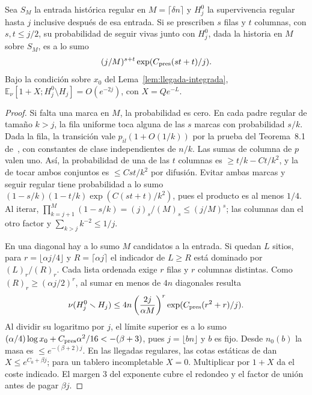 \begin{lema}\label{lem:prescripcion-larga}
Sea \(S_M\) la entrada histórica regular en \(M=\lceil\delta n\rceil\) y \(H^0_j\)
la supervivencia regular hasta \(j\) inclusive después de esa entrada. Si se prescriben
\(s\) filas y \(t\) columnas, con \(s,t\le j/2\), su probabilidad de seguir vivas junto
con \(H_j^0\), dada la historia en \(M\) sobre \(S_M\), es a lo sumo
\[
 (j/M)^{s+t}\exp(C_{\rm pres}(st+t)/j).
\]
Bajo la condición sobre \(x_0\) del Lema~\ref{lem:llegada-integrada},
\(\mathbb E_\nu[1+X;H^0_j\setminus H_j]=O(e^{-2j})\), con \(X=Qe^{-L}\).
\end{lema}
\begin{proof}
Si falta una marca en \(M\), la probabilidad es cero. En cada padre regular de tamaño
\(k>j\), la fila uniforme toca alguna de las \(s\) marcas con probabilidad \(s/k\).
Dada la fila, la transición vale \(p_{il}(1+O(1/k))\) por la prueba del
Teorema~8.1 de~\cite{pc}, con constantes de clase independientes de \(n/k\).
Las sumas de columna de \(p\) valen uno. Así, la probabilidad de una de las \(t\) columnas
es \(\ge t/k-Ct/k^2\), y la de tocar ambos conjuntos es \(\le Cst/k^2\) por difusión.
Evitar ambas marcas y seguir regular tiene probabilidad a lo sumo
\((1-s/k)(1-t/k)\exp(C(st+t)/k^2)\), pues el producto es al menos \(1/4\).
Al iterar, \(\prod_{k=j+1}^M(1-s/k)=(j)_s/(M)_s\le(j/M)^s\);
las columnas dan el otro factor y \(\sum_{k>j}k^{-2}\le1/j\).

En una diagonal hay a lo sumo \(M\) candidatos a la entrada. Si quedan \(L\) sitios,
para \(r=\lfloor\alpha j/4\rfloor\) y \(R=\lceil\alpha j\rceil\) el indicador de \(L\ge R\)
está dominado por \((L)_r/(R)_r\). Cada lista ordenada exige \(r\) filas y \(r\) columnas
distintas. Como \((R)_r\ge(\alpha j/2)^r\), al sumar en menos de \(4n\) diagonales resulta
\[
 \nu(H^0_j\setminus H_j)\le
 4n\left(\frac{2j}{\alpha M}\right)^r
      \exp(C_{\rm pres}(r^2+r)/j).
\]
Al dividir su logaritmo por \(j\), el límite superior es a lo sumo
\((\alpha/4)\log x_0+C_{\rm pres}\alpha^2/16<-(\beta+3)\), pues
\(j=\lfloor bn\rfloor\) y \(b\) es fijo. Desde \(n_0(b)\) la masa es
\(\le e^{-(\beta+2)j}\). En las llegadas regulares, las cotas estáticas de
\cite[6.5--6.8]{tc} dan \(X\le e^{C_0+\beta j}\); para un tablero incompletable \(X=0\).
Multiplicar por \(1+X\) da el coste indicado. El margen \(3\) del exponente cubre
el redondeo y el factor de unión antes de pagar \(\beta j\).
\end{proof}
